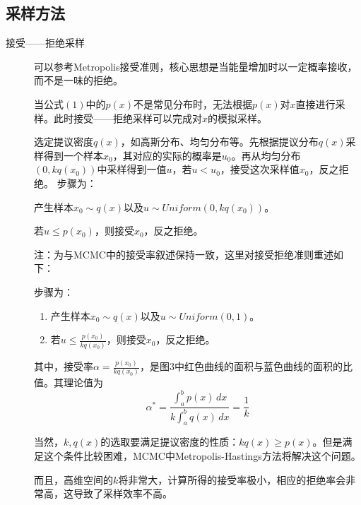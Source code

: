 \documentclass{ctexart}
\begin{document}
\subsection{采样方法}
\label{sampling}
\begin{description}

\item[接受——拒绝采样]
可以参考Metropolis接受准则，核心思想是当能量增加时以一定概率接收，而不是一味的拒绝。

当公式$\left(1\right)$中的$p\left(x\right)$不是常见分布时，无法根据$p\left(x\right)$对$x$直接进行采样。此时接受——拒绝采样可以完成对$x$的模拟采样。

选定提议密度$q\left(x\right)$，如高斯分布、均匀分布等。先根据提议分布$q\left(x\right)$采样得到一个样本$x_0$，其对应的实际的概率是$u_0$。再从均匀分布$\left(0,kq\left(x_0\right)\right)$中采样得到一值$u$，若$u<u_0$，接受这次采样值$x_0$，反之拒绝。
步骤为：
\begin{enumerate}[-]
\begin{item}
产生样本$x_0\sim q\left(x\right)$以及$u  \sim Uniform\left(0,kq\left(x_0\right)\right)$。
\end{item}
\begin{item}
 若$u\le p\left(x_0\right)$，则接受$x_0$，反之拒绝。
\end{item}
\end{enumerate}


注：为与MCMC中的接受率叙述保持一致，这里对接受拒绝准则重述如下：


步骤为：
\begin{enumerate}[-]
\item
产生样本$x_0\sim q\left(x\right)$以及$u  \sim Uniform\left(0,1\right)$。

\item
 若$u\le \frac{p\left(x_0\right)}{kq\left(x_0\right)}$，则接受$x_0$，反之拒绝。

\end{enumerate}
其中，接受率$\alpha=\frac{p\left(x_0\right)}{kq\left(x_0\right)}$，是图3中红色曲线的面积与蓝色曲线的面积的比值。其理论值为
\begin{equation}
\alpha^* = \frac{\int_a^b p\left(x\right) \,dx}{k\int_a^b q\left(x\right) \,dx}=\frac{1}{k}
\end{equation}

当然，$k,q\left(x\right)$的选取要满足提议密度的性质：$kq\left(x\right)\ge p\left(x\right)$。但是满足这个条件比较困难，MCMC中Metropolis-Hastings方法将解决这个问题。

而且，高维空间的$k$将非常大，计算所得的接受率极小，相应的拒绝率会非常高，这导致了采样效率不高\cite{mcmc:Xu}。



\end{description}
\end{document}
